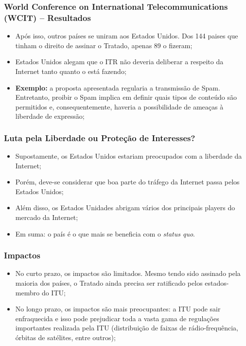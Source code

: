 \documentclass{beamer}
\begin{document}
\begin{frame}
\frametitle{World Conference on International Telecommunications (WCIT) -- Resultados}
\begin{itemize}
\item Após isso, outros países se uniram aos Estados Unidos. Dos 144 paises que tinham o direito de assinar o Tratado, apenas 89 o fizeram;
\item Estados Unidos alegam que o ITR não deveria deliberar a respeito da Internet tanto quanto o está fazendo;
\item \textbf{Exemplo:} a proposta apresentada regularia a transmissão de Spam. Entretanto, proibir o Spam implica em definir quais tipos de conteúdo são permitidos e, consequentemente, haveria a possibilidade de ameaças à liberdade de expressão;
\end{itemize}
\end{frame}


\begin{frame}
\frametitle{Luta pela Liberdade ou Proteção de Interesses?}
\begin{itemize}
\item Supostamente, os Estados Unidos estariam preocupados com a liberdade da Internet;
\item Porém, deve-se considerar que boa parte do tráfego da Internet passa pelos Estados Unidos;
\item Além disso, os Estados Unidades abrigam vários dos principais players do mercado da Internet;
\item Em suma: o país é o que mais se beneficia com o \emph{status quo}.
\end{itemize}
\end{frame}


\begin{frame}
\frametitle{Impactos}
\begin{itemize}
\item No curto prazo, os impactos são limitados. Mesmo tendo sido assinado pela maioria dos países, o Tratado ainda precisa ser ratificado pelos estados-membro do ITU;
\item No longo prazo, os impactos são mais preocupantes: a ITU pode sair enfraquecida e isso pode prejudicar toda a vasta gama de regulações importantes realizada pela ITU (distribuição de faixas de rádio-frequência, órbitas de satélites, entre outros);
\end{itemize}
\end{frame}
\end{document}
